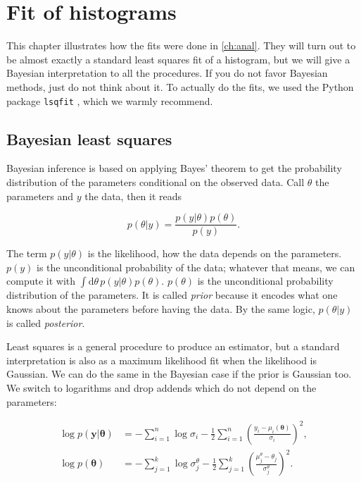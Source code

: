 \chapter{Fit of histograms}
\label{ch:fit}

This chapter illustrates how the fits were done in \autoref{ch:anal}. They will
turn out to be almost exactly a standard least squares fit of a histogram, but
we will give a Bayesian interpretation to all the procedures. If you do not
favor Bayesian methods, just do not think about it. To actually do the fits, we
used the Python package \texttt{lsqfit} \cite{lepage2021}, which we warmly
recommend.

\section{Bayesian least squares}

Bayesian inference is based on applying Bayes' theorem to get the probability
distribution of the parameters conditional on the observed data. Call $\theta$
the parameters and $y$ the data, then it reads

\begin{equation}
    p(\theta|y) = \frac {p(y|\theta) p(\theta)} {p(y)}.
\end{equation}

The term $p(y|\theta)$ is the likelihood, how the data depends on the
parameters. $p(y)$ is the unconditional probability of the data; whatever that
means, we can compute it with $\int\mathrm d\theta\,p(y|\theta)p(\theta)$.
$p(\theta)$ is the unconditional probability distribution of the parameters. It
is called \emph{prior} because it encodes what one knows about the parameters
before having the data. By the same logic, $p(\theta|y)$ is called
\emph{posterior}.

Least squares is a general procedure to produce an estimator, but a standard
interpretation is also as a maximum likelihood fit when the likelihood is
Gaussian. We can do the same in the Bayesian case if the prior is Gaussian too.
We switch to logarithms and drop addends which do not depend on the parameters:

\begin{align}
    \log p(\mathbf y|\boldsymbol\theta) &=
    -\sum_{i=1}^n \log\sigma_i
    -\frac 12 \sum_{i=1}^n
    \left( \frac {y_i - \mu_i(\boldsymbol\theta)} {\sigma_i} \right)^2, \\
    \log p(\boldsymbol\theta) &=
    -\sum_{j=1}^k \log\sigma^\theta_j
    -\frac 12 \sum_{j=1}^k
    \left( \frac {\mu^\theta_j - \theta_j} {\sigma^\theta_j} \right)^2.
\end{align}

